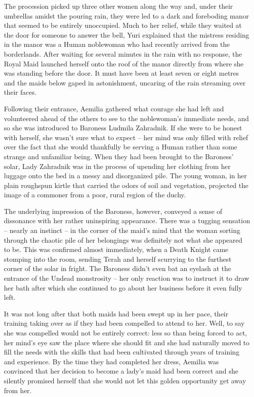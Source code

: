  

The procession picked up three other women along the way and, under their umbrellas amidst the pouring rain, they were led to a dark and foreboding manor that seemed to be entirely unoccupied. Much to her relief, while they waited at the door for someone to answer the bell, Yuri explained that the mistress residing in the manor was a Human noblewoman who had recently arrived from the borderlands. After waiting for several minutes in the rain with no response, the Royal Maid launched herself onto the roof of the manor directly from where she was standing before the door. It must have been at least seven or eight metres and the maids below gaped in astonishment, uncaring of the rain streaming over their faces.

 

Following their entrance, Aemilia gathered what courage she had left and volunteered ahead of the others to see to the noblewoman’s immediate needs, and so she was introduced to Baroness Ludmila Zahradnik. If she were to be honest with herself, she wasn’t sure what to expect – her mind was only filled with relief over the fact that she would thankfully be serving a Human rather than some strange and unfamiliar being. When they had been brought to the Baroness’ solar, Lady Zahradnik was in the process of upending her clothing from her luggage onto the bed in a messy and disorganized pile. The young woman, in her plain roughspun kirtle that carried the odors of soil and vegetation, projected the image of a commoner from a poor, rural region of the duchy.

 

The underlying impression of the Baroness, however, conveyed a sense of dissonance with her rather uninspiring appearance. There was a tugging sensation – nearly an instinct – in the corner of the maid’s mind that the woman sorting through the chaotic pile of her belongings was definitely not what she appeared to be. This was confirmed almost immediately, when a Death Knight came stomping into the room, sending Terah and herself scurrying to the furthest corner of the solar in fright. The Baroness didn’t even bat an eyelash at the entrance of the Undead monstrosity – her only reaction was to instruct it to draw her bath after which she continued to go about her business before it even fully left.

 

It was not long after that both maids had been swept up in her pace, their training taking over as if they had been compelled to attend to her. Well, to say she was compelled would not be entirely correct: less so than being forced to act, her mind’s eye saw the place where she should fit and she had naturally moved to fill the needs with the skills that had been cultivated through years of training and experience. By the time they had completed her dress, Aemilia was convinced that her decision to become a lady’s maid had been correct and she silently promised herself that she would not let this golden opportunity get away from her.

